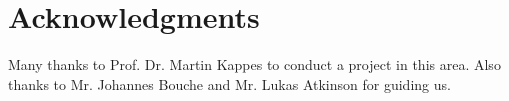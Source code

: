 

\bigskip

\begingroup
\let\clearpage\relax
\let\cleardoublepage\relax
\let\cleardoublepage\relax
\chapter*{Acknowledgments}
Many thanks to Prof. Dr. Martin Kappes to conduct a project in this area. Also thanks to Mr. Johannes Bouche and Mr. Lukas Atkinson for guiding us. 



\bigskip




\endgroup



